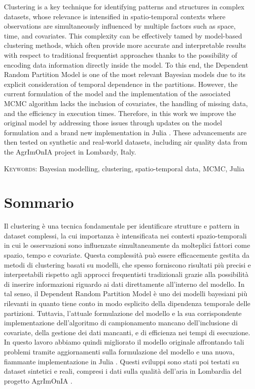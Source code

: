 \documentclass[12pt,	%
	a4paper,		%
	twoside,		%
	openright,		%
	titlepage,%
	]{book}
\theoremstyle{definition}
\let\cite\citep
\begin{document}
Clustering is a key technique for identifying patterns and structures in complex datasets, whose relevance is intensified in spatio-temporal contexts where observations are simultaneously influenced by multiple factors such as space, time, and covariates. 
This complexity can be effectively tamed by model-based clustering methods, which often provide more accurate and interpretable results with respect to traditional frequentist approaches thanks to the possibility of encoding data information directly inside the model. 
To this end, the Dependent Random Partition Model \cite{1-drpm} is one of the most relevant Bayesian models due to its explicit consideration of temporal dependence in the partitions. However, the current formulation of the model and the implementation of the associated MCMC algorithm lacks the inclusion of covariates, the handling of missing data, and the efficiency in execution times. Therefore, in this work we improve the original model by addressing those issues through updates on the model formulation and a brand new implementation in Julia \cite{Julia-cite}. These advancements are then tested on synthetic and real-world datasets, including air quality data from the AgrImOnIA project \cite{agrimonia} in Lombardy, Italy.

\textsc{Keywords:} Bayesian modelling, clustering, spatio-temporal data, MCMC, Julia


\cleardoublepage

\chapter*{Sommario}

Il clustering è una tecnica fondamentale per identificare strutture e pattern in dataset complessi, la cui importanza è intensificata nei contesti spazio-temporali in cui le osservazioni sono influenzate simultaneamente da molteplici fattori come spazio, tempo e covariate. 
Questa complessità può essere efficacemente gestita da metodi di clustering basati su modelli, che spesso forniscono risultati più precisi e interpretabili rispetto agli approcci frequentisti tradizionali grazie alla possibilità di inserire informazioni riguardo ai dati direttamente all'interno del modello.
In tal senso, il Dependent Random Partition Model \cite{1-drpm} è uno dei modelli bayesiani più rilevanti in quanto tiene conto in modo esplicito della dipendenza temporale delle partizioni. 
Tuttavia, l'attuale formulazione del modello e la sua corrispondente implementazione dell'algoritmo di campionamento mancano dell'inclusione di covariate, della gestione dei dati mancanti, e di efficienza nei tempi di esecuzione. In questo lavoro abbiamo quindi migliorato il modello originale affrontando tali problemi tramite aggiornamenti sulla formulazione del modello e una nuova, fiammante implementazione in Julia \cite{Julia-cite}. Questi sviluppi sono stati poi testati su dataset sintetici e reali, compresi i dati sulla qualità dell'aria in Lombardia del progetto AgrImOnIA \cite{agrimonia}.
\end{document}
